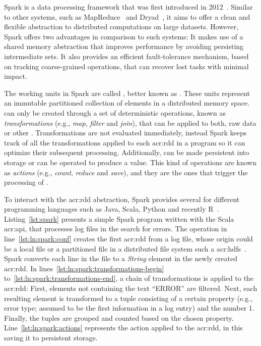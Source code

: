 \label{sec:spark}


Spark is a data processing framework that was first introduced in 2012~\cite{Zaharia2012a}. Similar to other systems, such as MapReduce~\cite{Dean2004} and Dryad~\cite{Isard2007}, it aims to offer a clean and flexible abstraction to distributed computations on large datasets. However, Spark offers two advantages in comparison to such systems: It makes use of a shared memory abstraction that improves performance by avoiding persisting intermediate sets. It also provides an efficient fault-tolerance mechanism, based on tracking coarse-grained operations, that can recover lost tasks with minimal impact.

The working units in Spark are called \textit{}, better known as . These units represent an immutable partitioned collection of elements in a distributed memory space.  can only be created through a set of deterministic operations, known as \textit{transformations} (e.g., \textit{map}, \textit{filter} and \textit{join}), that can be applied to both, raw data or other . Transformations are not evaluated immediately, instead Spark keeps track of all the transformations applied to each \acrshort{acr:rdd} in a program so it can optimize their subsequent processing. Additionally,  can be made persistent into storage or can be operated to produce a value. This kind of operations are known as \textit{actions} (e.g., \textit{count}, \textit{reduce} and \textit{save}), and they are the ones that trigger the processing of .

To interact with the \acrshort{acr:rdd} abstraction, Spark provides several  for different programming languages such as Java, Scala, Python and recently R~\cite{Venkataraman2016}. Listing~\ref{lst:spark} presents a simple Spark program written with the Scala \acrshort{acr:api}, that processes log files in the search for errors. The operation in line~\ref{lst:ln:spark:conf} creates the first \acrshort{acr:rdd} from a log file, whose origin could be a local file or a partitioned file in a distributed file system such a \acrfull{acr:hdfs}~\cite{WebHadoop2017}. Spark converts each line in the file to a \textit{String} element in the newly created \acrshort{acr:rdd}. In lines~\ref{lst:ln:spark:transformations-begin} to~\ref{lst:ln:spark:transformations-end}, a chain of transformations is applied to the \acrshort{acr:rdd}: First, elements not containing the text ``ERROR'' are filtered. Next, each resulting element is transformed to a tuple consisting of a certain property (e.g., error type; assumed to be the first information in a log entry) and the number 1. Finally, the tuples are grouped and counted based on the chosen property. Line~\ref{lst:ln:spark:actions} represents the action applied to the \acrshort{acr:rdd}, in this saving it to persistent storage.

